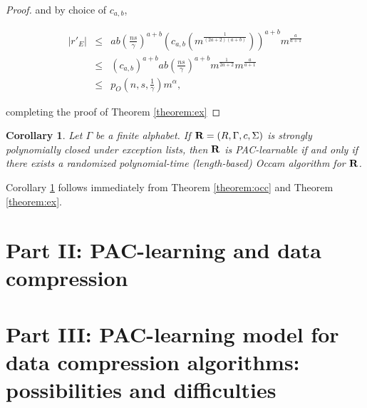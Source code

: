 \documentclass[12pt]{article}
\newtheorem{corollary}[theorem]{Corollary}
\begin{document}
\begin{proof}
and by choice of $c_{a,b}$,

\begin{eqnarray*}
|r'_E|
&\le& ab (\frac{ns}{\gamma})^{a+b} (c_{a,b} (m^{\frac {1}{(2a+2)(a+b)}}))^{a+b} m^{\frac {a}{a+1}} \\
&\le& (c_{a,b})^{a+b} ab (\frac{ns}{\gamma})^{a+b} m^{\frac {1}{2a+2}}  m^{\frac {a}{a+1}} \\
&\le& p_O(n, s, \frac {1}{\gamma})m^{\alpha},
\end{eqnarray*}

completing the proof of Theorem \ref{theorem:ex}
\end{proof}

\begin{corollary} \label {corollary:ex}
Let $\Gamma$ be a finite alphabet. If ${\bf R} = (R, \Gamma, c, \Sigma)$ is strongly polynomially closed under exception lists, then ${\bf R}$ is PAC-learnable if and only if there exists a randomized polynomial-time (length-based) Occam algorithm for ${\bf R}$.
\end{corollary}

Corollary \ref{corollary:ex} follows immediately from Theorem \ref{theorem:occ} and Theorem \ref{theorem:ex}.

\section{Part II: PAC-learning and data compression}




\section{Part III: PAC-learning model for data compression algorithms: possibilities and difficulties}

\end{document}
